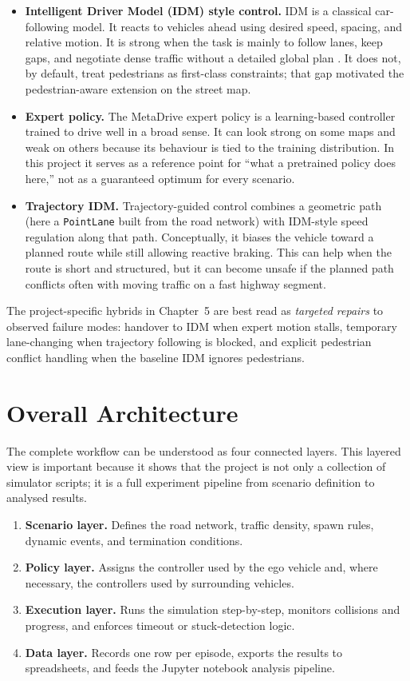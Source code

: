\documentclass[12pt,a4paper]{report}
\begin{document}
\begin{itemize}
    \item \textbf{Intelligent Driver Model (IDM) style control.} IDM is a classical car-following model. It reacts to vehicles ahead using desired speed, spacing, and relative motion. It is strong when the task is mainly to follow lanes, keep gaps, and negotiate dense traffic without a detailed global plan \cite{treiber2000congested}. It does not, by default, treat pedestrians as first-class constraints; that gap motivated the pedestrian-aware extension on the street map.
    \item \textbf{Expert policy.} The MetaDrive expert policy is a learning-based controller trained to drive well in a broad sense. It can look strong on some maps and weak on others because its behaviour is tied to the training distribution. In this project it serves as a reference point for ``what a pretrained policy does here,'' not as a guaranteed optimum for every scenario.
    \item \textbf{Trajectory IDM.} Trajectory-guided control combines a geometric path (here a \texttt{PointLane} built from the road network) with IDM-style speed regulation along that path. Conceptually, it biases the vehicle toward a planned route while still allowing reactive braking. This can help when the route is short and structured, but it can become unsafe if the planned path conflicts often with moving traffic on a fast highway segment.
\end{itemize}

The project-specific hybrids in Chapter~5 are best read as \emph{targeted repairs} to observed failure modes: handover to IDM when expert motion stalls, temporary lane-changing when trajectory following is blocked, and explicit pedestrian conflict handling when the baseline IDM ignores pedestrians.

\section{Overall Architecture}
The complete workflow can be understood as four connected layers. This layered view is important because it shows that the project is not only a collection of simulator scripts; it is a full experiment pipeline from scenario definition to analysed results.

\begin{enumerate}[label=\textbf{L\arabic*:}, leftmargin=2.2cm]
    \item \textbf{Scenario layer.} Defines the road network, traffic density, spawn rules, dynamic events, and termination conditions.
    \item \textbf{Policy layer.} Assigns the controller used by the ego vehicle and, where necessary, the controllers used by surrounding vehicles.
    \item \textbf{Execution layer.} Runs the simulation step-by-step, monitors collisions and progress, and enforces timeout or stuck-detection logic.
    \item \textbf{Data layer.} Records one row per episode, exports the results to spreadsheets, and feeds the Jupyter notebook analysis pipeline.
\end{enumerate}
\end{document}
